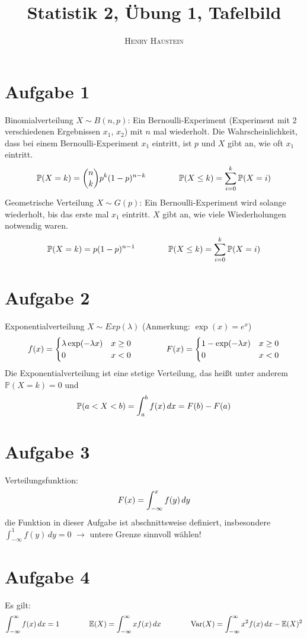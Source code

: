 \documentclass{article}
\title{\textbf{Statistik 2, Übung 1, Tafelbild}}
\author{\textsc{Henry Haustein}}
\date{}
\begin{document}
	\maketitle
	
	\section*{Aufgabe 1}
	Binomialverteilung $X\sim B(n,p)$: Ein Bernoulli-Experiment (Experiment mit 2 verschiedenen Ergebnissen $x_1$, $x_2$) mit $n$ mal wiederholt. Die Wahrscheinlichkeit, dass bei einem Bernoulli-Experiment $x_1$ eintritt, ist $p$ und $X$ gibt an, wie oft $x_1$ eintritt.
	\begin{align}
		\mathbb{P}(X = k) = \binom{n}{k}p^k(1-p)^{n-k} \qquad\qquad
		\mathbb{P}(X \le k) = \sum_{i=0}^{k} \mathbb{P}(X = i) \notag
	\end{align}
	Geometrische Verteilung $X\sim G(p)$: Ein Bernoulli-Experiment wird solange wiederholt, bis das erste mal $x_1$ eintritt. $X$ gibt an, wie viele Wiederholungen notwendig waren.
	\begin{align}
		\mathbb{P}(X = k) = p(1-p)^{n-1} \qquad\qquad
		\mathbb{P}(X\le k) = \sum_{i=0}^k \mathbb{P}(X = i) \notag
	\end{align}

	\section*{Aufgabe 2}
	Exponentialverteilung $X\sim Exp(\lambda)$ (Anmerkung: $\exp(x) = e^x$)
	\begin{align}
		f(x) = \begin{cases}
			\lambda\exp(-\lambda x) & x\ge 0 \\
			0 & x<0
		\end{cases} \qquad\qquad
		F(x) = \begin{cases}
			1-\exp(-\lambda x) &x\ge 0 \\
			0 & x<0
		\end{cases} \notag 
	\end{align}
	Die Exponentialverteilung ist eine stetige Verteilung, das heißt unter anderem $\mathbb{P}(X = k) = 0$ und
	\begin{align}
		\mathbb{P}(a < X < b) = \int_{a}^{b} f(x)\,dx = F(b) - F(a) \notag
	\end{align}

	\section*{Aufgabe 3}
	Verteilungsfunktion: 
	\begin{align}
		F(x) = \int_{-\infty}^x f(y)\, dy \notag
	\end{align}
	 die Funktion in dieser Aufgabe ist abschnittsweise definiert, insbesondere $\int_{-\infty}^1 f(y)\, dy = 0$ $\to$ untere Grenze sinnvoll wählen!
	
	\section*{Aufgabe 4}
	Es gilt:
	\begin{align}
		\int_{-\infty}^\infty f(x) \,dx = 1 \qquad\qquad \mathbb{E}(X) = \int_{-\infty}^\infty xf(x)\,dx \qquad\qquad \text{Var}(X) = \int_{-\infty}^\infty x^2f(x)\,dx - \mathbb{E}(X)^2 \notag
	\end{align}
	
\end{document}
